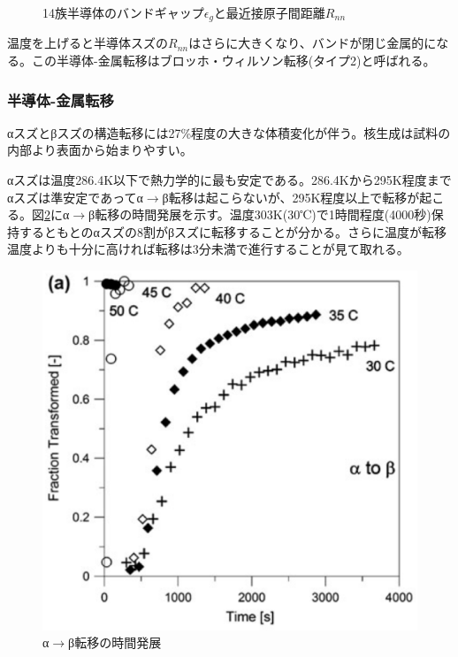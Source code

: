 \begin{figure}[!h]
\begin{minipage}{0.6\hsize}
\begin{center}
  \end{center}
  \caption{14族半導体のバンドギャップ$\epsilon_g$と最近接原子間距離$R_{nn}$\cite{Yonezawa}}
  \label{fig:bandgaps}
 \end{minipage}
\end{figure}

温度を上げると半導体スズの$R_{nn}$はさらに大きくなり、バンドが閉じ金属的になる。この半導体-金属転移はブロッホ・ウィルソン転移(タイプ2)と呼ばれる\cite{Yonezawa}。

\subsubsection{半導体-金属転移}
αスズとβスズの構造転移には27\%程度の大きな体積変化が伴う。核生成は試料の内部より表面から始まりやすい\cite{Cornelius}。

αスズは温度286.4K以下で熱力学的に最も安定である。286.4Kから295K程度までαスズは準安定であってα$\to$β転移は起こらないが、295K程度以上で転移が起こる。図\ref{fig:alpha-to-beta}にα$\to$β転移の時間発展を示す\cite{Nogita}。温度303K(30℃)で1時間程度(4000秒)保持するともとのαスズの8割がβスズに転移することが分かる。さらに温度が転移温度よりも十分に高ければ転移は3分未満で進行することが見て取れる。
\begin{figure}[!h]
  \begin{center}
   \includegraphics[width=0.5\hsize]{Introduction/alpha-to-beta.eps}
  \end{center}
  \caption{α$\to$β転移の時間発展\cite{Nogita}}
  \label{fig:alpha-to-beta}
  \end{figure}

